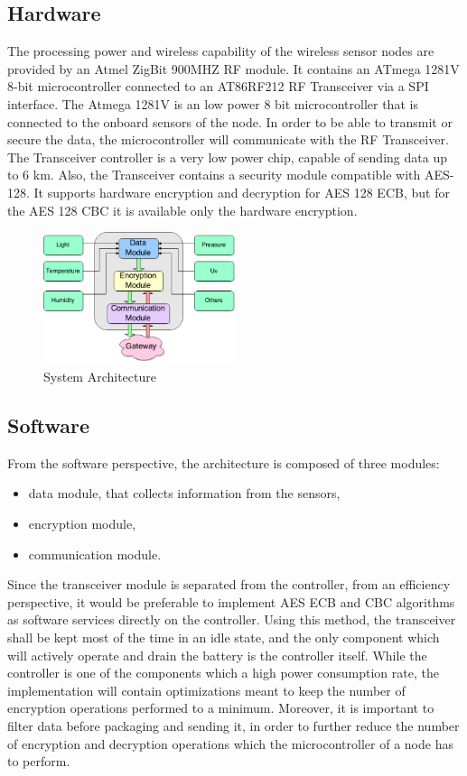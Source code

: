 \label{chap:arch}
\subsection{Hardware}

The processing power and wireless capability of the wireless sensor nodes are provided by an Atmel
ZigBit 900MHZ RF module. It contains an ATmega 1281V 8-bit microcontroller connected to an
AT86RF212 RF Transceiver via a SPI interface. The Atmega 1281V is an low power 8 bit microcontroller
that is connected to the onboard sensors of the node. In order to be able to transmit or secure the
data, the microcontroller will communicate with the RF Transceiver. The Transceiver controller is a very low power chip,
capable of sending data up to 6 km. Also, the Transceiver contains a security module compatible
with AES-128. It supports hardware encryption and decryption for AES 128 ECB, but for the AES
128 CBC it is available only the hardware encryption.


\begin{figure}[ht] \centering
  \includegraphics[width=0.5\textwidth]{img/wsn-soa-system-arch.png}
  \caption{System Architecture}
\end{figure}

\subsection{Software}

From the software perspective, the architecture is composed of three modules:
\begin{itemize}
\item data module, that
collects information from the sensors,
\item encryption module,
\item communication module.
\end{itemize}

Since the transceiver module is separated from the controller, from an efficiency perspective, it 
would be preferable to implement AES ECB and CBC algorithms as software services directly on the 
controller. Using this method, the transceiver shall be kept most of the time in an idle state, 
and the only component which will actively operate and drain the battery is the controller itself.
While the controller is one of the components which a high power consumption rate, the implementation 
will contain optimizations meant to keep the number of encryption operations performed to a minimum.
Moreover, it is important to filter data before packaging and sending it, in order to further 
reduce the number of encryption and decryption operations which the microcontroller of a node has 
to perform.

